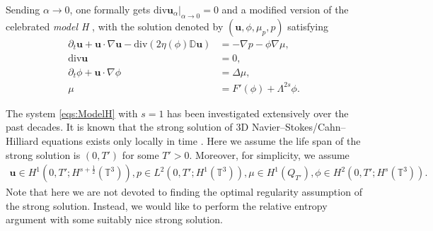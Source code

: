 \documentclass[reqno,a4paper,11pt]{amsart}
\theoremstyle{plain}
\numberwithin{equation}{section}
\begin{document}
							
							
							Sending $\alpha\rightarrow0$, one formally gets $\mathrm{div} \mathbf{u}_{\alpha}|_{\alpha \to 0}=0$ and a modified version of the celebrated \textit{model H} \cite{HH}, with the solution denoted by $(\mathbf{u},\phi, \mu_{p},p)$ satisfying
							\begin{subequations}
								\label{eqs:ModelH}
								\begin{align}
									\partial_t  \mathbf{u} +\mathbf{u}\cdot\nabla \mathbf{u}-\mathrm{div}(2\eta(\phi)\mathbb{ D}\mathbf{u}) &=-\nabla p-\phi \nabla \mu, \\
									\mathrm{div} \mathbf{u}&= 0  \label{imcompressible},\\
									\partial_t\phi + \mathbf{u}\cdot\nabla \phi &=\Delta\mu \label{no density},\\
									\mu& =F'(\phi)+\Lambda^{2s} \phi.
								\end{align}
							\end{subequations}
							
							The system \eqref{eqs:ModelH} with $s=1$ has been investigated extensively over the past decades. It is known that the strong solution of 3D Navier--Stokes/Cahn--Hilliard equations exists only locally in time \cite{AbelsARMA2009,GMT}. Here we assume the life span of the strong solution is $(0,T')$ for some $T' > 0$. Moreover, for simplicity, we assume
							\begin{align}
								\label{eqs:reg-assump}
								\mathbf{u}\in H^{1}(0,T';H^{s+\frac{1}{2}}(\mathbb{T}^{3})), p\in L^{2}(0,T';H^{1}(\mathbb{T}^{3})), \mu\in H^{1}(Q_{T'}),  \phi\in H^2(0,T';H^{s}(\mathbb{T}^{3})).
							\end{align}
							Note that here we are not devoted to finding the optimal regularity assumption of the strong solution. Instead, we would like to perform the relative entropy argument with some suitably nice strong solution.
							
\end{document}
